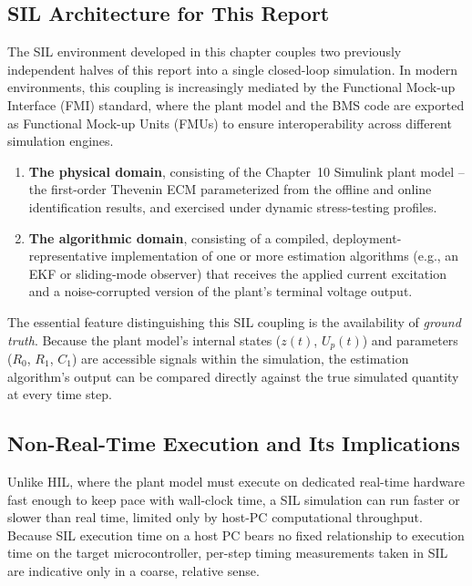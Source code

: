 \subsection{SIL Architecture for This Report}
\label{ssec:sil_architecture}

The SIL environment developed in this chapter couples two previously independent halves of this report into a single closed-loop simulation. In modern environments, this coupling is increasingly mediated by the Functional Mock-up Interface (FMI) standard, where the plant model and the BMS code are exported as Functional Mock-up Units (FMUs) to ensure interoperability across different simulation engines.

\begin{enumerate}
	\item \textbf{The physical domain}, consisting of the Chapter~10 Simulink plant model -- the first-order Thevenin ECM parameterized from the offline and online identification results, and exercised under dynamic stress-testing profiles.
	\item \textbf{The algorithmic domain}, consisting of a compiled, deployment-representative implementation of one or more estimation algorithms (e.g., an EKF or sliding-mode observer) that receives the applied current excitation and a noise-corrupted version of the plant's terminal voltage output.
\end{enumerate}

The essential feature distinguishing this SIL coupling is the availability of \emph{ground truth}. Because the plant model's internal states ($z(t)$, $U_p(t)$) and parameters ($R_0$, $R_1$, $C_1$) are accessible signals within the simulation, the estimation algorithm's output can be compared directly against the true simulated quantity at every time step. 

\subsection{Non-Real-Time Execution and Its Implications}
\label{ssec:sil_nonrealtime}

Unlike HIL, where the plant model must execute on dedicated real-time hardware fast enough to keep pace with wall-clock time, a SIL simulation can run faster or slower than real time, limited only by host-PC computational throughput. Because SIL execution time on a host PC bears no fixed relationship to execution time on the target microcontroller, per-step timing measurements taken in SIL are indicative only in a coarse, relative sense. 

